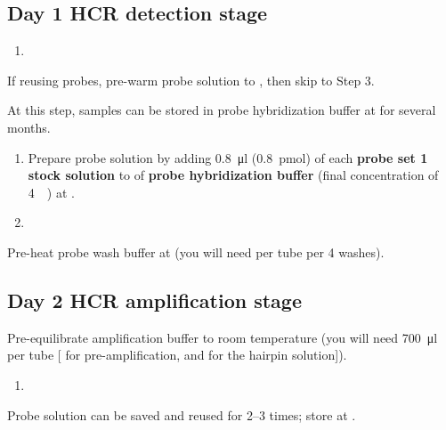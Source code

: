 \documentclass[10pt]{report}
\begin{document}
\subsection*{Day 1 \textendash{} HCR detection stage}
\begin{enumerate}[series = steps]
	\item {}
\end{enumerate}

\bigskip\alert{If reusing probes, pre-warm probe solution to \thirtysevendegree, then skip to Step 3.}

\alert{At this step, samples can be stored in probe hybridization buffer at \minustwenty{} for several months.}

\begin{enumerate}[resume = steps]
	\item Prepare probe solution by adding \qty{0.8}{\ul} (\qty{0.8}{\pmol}) of each \textbf{probe set \qty{1}{\micro\molar} stock solution} to \twohunmicrol{} of \textbf{probe hybridization buffer} (final concentration of \qty{4}{\nano\molar}) at \thirtysevendegree.\\
	\item {}
\end{enumerate}

\bigskip\alert{Pre-heat probe wash buffer at \thirtysevendegree{} (you will need \fivehunmicrol per tube per 4 washes).}


\subsection*{Day 2 \textendash{} HCR amplification stage}

\alert{Pre-equilibrate amplification buffer to room temperature (you will need \qty{700}{\ul} per tube [\fivehunmicrol{} for pre-amplification, and \twohunmicrol{} for the hairpin solution]).}
\begin{enumerate}[series = steps]
	\item {}
\end{enumerate}

\bigskip\alert{Probe solution can be saved and reused for 2--3 times; store at \minustwenty.}
\end{document}

